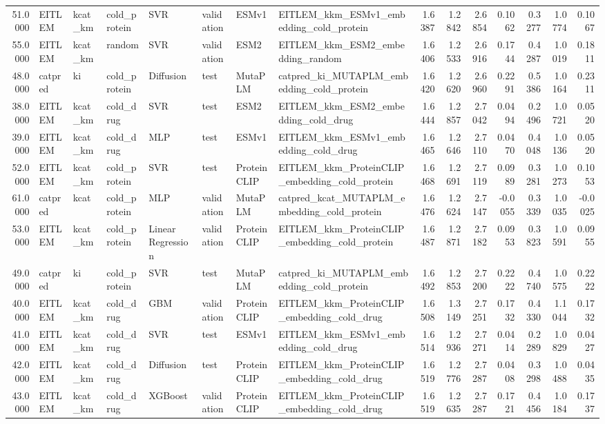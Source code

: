 \begin{tabular}{rlllllllrrrrrrr}
51.0000 & EITLEM & kcat_km & cold_protein & SVR & validation & ESMv1 & EITLEM_kkm_ESMv1_embedding_cold_protein & 1.6387 & 1.2842 & 2.6854 & 0.1062 & 0.3277 & 1.0774 & 0.1067 \\
55.0000 & EITLEM & kcat_km & random & SVR & validation & ESM2 & EITLEM_kkm_ESM2_embedding_random & 1.6406 & 1.2533 & 2.6916 & 0.1744 & 0.4287 & 1.0019 & 0.1811 \\
48.0000 & catpred & ki & cold_protein & Diffusion & test & MutaPLM & catpred_ki_MUTAPLM_embedding_cold_protein & 1.6420 & 1.2620 & 2.6960 & 0.2291 & 0.5386 & 1.0164 & 0.2311 \\
38.0000 & EITLEM & kcat_km & cold_drug & SVR & test & ESM2 & EITLEM_kkm_ESM2_embedding_cold_drug & 1.6444 & 1.2857 & 2.7042 & 0.0494 & 0.2496 & 1.0721 & 0.0520 \\
39.0000 & EITLEM & kcat_km & cold_drug & MLP & test & ESMv1 & EITLEM_kkm_ESMv1_embedding_cold_drug & 1.6465 & 1.2646 & 2.7110 & 0.0470 & 0.4048 & 1.0136 & 0.0520 \\
52.0000 & EITLEM & kcat_km & cold_protein & SVR & test & ProteinCLIP & EITLEM_kkm_ProteinCLIP_embedding_cold_protein & 1.6468 & 1.2691 & 2.7119 & 0.0989 & 0.3281 & 1.0273 & 0.1053 \\
61.0000 & catpred & kcat & cold_protein & MLP & validation & MutaPLM & catpred_kcat_MUTAPLM_embedding_cold_protein & 1.6476 & 1.2624 & 2.7147 & -0.0055 & 0.3339 & 1.0035 & -0.0025 \\
53.0000 & EITLEM & kcat_km & cold_protein & Linear Regression & validation & ProteinCLIP & EITLEM_kkm_ProteinCLIP_embedding_cold_protein & 1.6487 & 1.2871 & 2.7182 & 0.0953 & 0.3823 & 1.0591 & 0.0955 \\
49.0000 & catpred & ki & cold_protein & SVR & test & MutaPLM & catpred_ki_MUTAPLM_embedding_cold_protein & 1.6492 & 1.2853 & 2.7200 & 0.2222 & 0.4740 & 1.0575 & 0.2222 \\
40.0000 & EITLEM & kcat_km & cold_drug & GBM & validation & ProteinCLIP & EITLEM_kkm_ProteinCLIP_embedding_cold_drug & 1.6508 & 1.3149 & 2.7251 & 0.1732 & 0.4330 & 1.1044 & 0.1732 \\
41.0000 & EITLEM & kcat_km & cold_drug & SVR & test & ESMv1 & EITLEM_kkm_ESMv1_embedding_cold_drug & 1.6514 & 1.2936 & 2.7271 & 0.0414 & 0.2289 & 1.0829 & 0.0427 \\
42.0000 & EITLEM & kcat_km & cold_drug & Diffusion & test & ProteinCLIP & EITLEM_kkm_ProteinCLIP_embedding_cold_drug & 1.6519 & 1.2776 & 2.7287 & 0.0408 & 0.3298 & 1.0488 & 0.0435 \\
43.0000 & EITLEM & kcat_km & cold_drug & XGBoost & validation & ProteinCLIP & EITLEM_kkm_ProteinCLIP_embedding_cold_drug & 1.6519 & 1.2635 & 2.7287 & 0.1721 & 0.4456 & 1.0184 & 0.1737 \\

\end{tabular}
